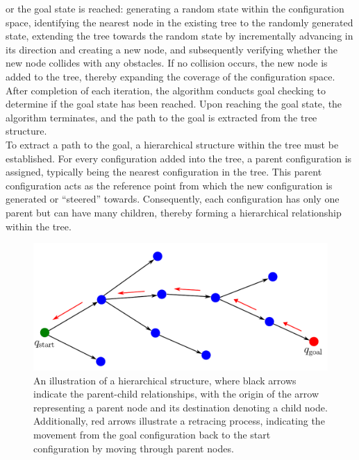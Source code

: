 \documentclass{ctuthesis}
\begin{document}
or the goal state is reached: generating a random state within the configuration space, 
identifying the nearest node in the existing tree to the randomly generated state, 
extending the tree towards the random state by incrementally advancing in its direction 
and creating a new node, 
and subsequently verifying whether the new node collides with any obstacles. 
If no collision occurs, 
the new node is added to the tree, thereby expanding the coverage of the configuration space.\\[12pt]
After completion of each iteration, 
the algorithm conducts goal checking to determine if the goal state has been reached. 
Upon reaching the goal state, 
the algorithm terminates, 
and the path to the goal is extracted from the tree structure.\\[12pt]
To extract a path to the goal, a hierarchical structure within the tree must be established. 
For every configuration added into the tree, 
a parent configuration is assigned, typically being the nearest configuration in the tree. 
This parent configuration acts as the reference point from which 
the new configuration is generated or ``steered'' towards. 
Consequently, each configuration has only one parent but can have many children, 
thereby forming a hierarchical relationship within the tree.
\begin{figure}[!ht]
  \centering
  \includegraphics[width=0.8\linewidth]{figChap3/ParentChild4.pdf}
  \caption{An illustration of a hierarchical structure, 
  where black arrows indicate the parent-child relationships, 
  with the origin of the arrow representing a parent node and 
  its destination denoting a child node. 
  Additionally, red arrows illustrate a retracing process, 
  indicating the movement from the goal configuration back to 
  the start configuration by moving through parent nodes.}
  \label{fig:ParentChild}
\end{figure} 
\end{document}
